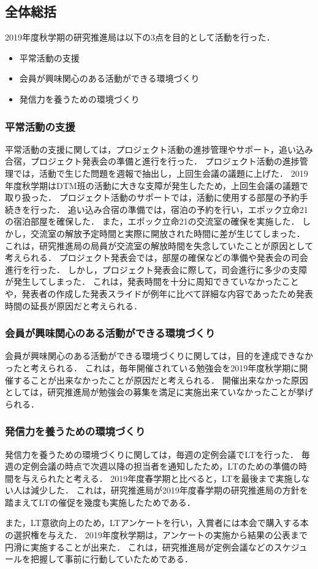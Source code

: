 \subsection*{全体総括}

2019年度秋学期の研究推進局は以下の3点を目的として活動を行った．
\begin{itemize}
\item 平常活動の支援
\item 会員が興味関心のある活動ができる環境づくり
\item 発信力を養うための環境づくり
\end{itemize}

\subsubsection*{平常活動の支援}
平常活動の支援に関しては，プロジェクト活動の進捗管理やサポート，追い込み合宿，プロジェクト発表会の準備と進行を行った．
プロジェクト活動の進捗管理では，活動で生じた問題を週報で抽出し，上回生会議の議題に上げた．
2019年度秋学期はDTM班の活動に大きな支障が発生したため，上回生会議の議題で取り扱った．
プロジェクト活動のサポートでは，活動に使用する部屋の予約手続きを行った．
追い込み合宿の準備では，宿泊の予約を行い，エポック立命21の宿泊部屋を確保した．
また，エポック立命21の交流室の確保を実施した．
しかし，交流室の解放予定時間と実際に開放された時間に差が生じてしまった．
これは，研究推進局の局員が交流室の解放時間を失念していたことが原因として考えられる．
プロジェクト発表会では，部屋の確保などの準備や発表会の司会進行を行った．
しかし，プロジェクト発表会に際して，司会進行に多少の支障が発生してしまった．
これは，発表時間を十分に周知できていなかったことや，発表者の作成した発表スライドが例年に比べて詳細な内容であったため発表時間の延長が原因だと考えられる．

\subsubsection*{会員が興味関心のある活動ができる環境づくり} 
会員が興味関心のある活動ができる環境づくりに関しては，目的を達成できなかったと考えられる．
これは，毎年開催されている勉強会を2019年度秋学期に開催することが出来なかったことが原因だと考えられる．
開催出来なかった原因としては，研究推進局が勉強会の募集を満足に実施出来ていなかったことが挙げられる．

\subsubsection*{発信力を養うための環境づくり} 
発信力を養うための環境づくりに関しては，毎週の定例会議でLTを行った．
毎週の定例会議の時点で次週以降の担当者を通知したため，LTのための準備の時間を与えられたと考える．
2019年度春学期と比べると，LTを最後まで実施しない人は減少した．
これは，研究推進局が2019年度春学期の研究推進局の方針を踏まえてLTの催促を幾度も実施したためである．

また，LT意欲向上のため，LTアンケートを行い，入賞者には本会で購入する本の選択権を与えた．
2019年度秋学期は，アンケートの実施から結果の公表まで円滑に実施することが出来た．
これは，研究推進局が定例会議などのスケジュールを把握して事前に行動していたためである．
